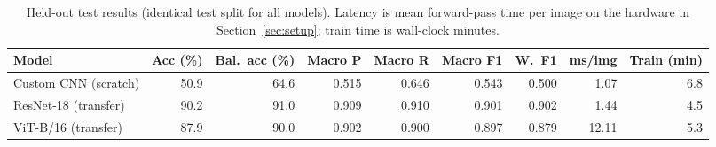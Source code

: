 \begin{table}[H]\centering\small
\caption{Held-out test results (identical test split for all models). Latency is mean forward-pass time per image on the hardware in Section~\ref{sec:setup}; train time is wall-clock minutes.}\label{tab:results}
\begin{tabular}{lrrrrrrrr}\toprule
Model & Acc (\%) & Bal.\ acc (\%) & Macro P & Macro R & Macro F1 & W.\ F1 & ms/img & Train (min) \\\midrule
Custom CNN (scratch) & 50.9 & 64.6 & 0.515 & 0.646 & 0.543 & 0.500 & 1.07 & 6.8 \\
ResNet-18 (transfer) & 90.2 & 91.0 & 0.909 & 0.910 & 0.901 & 0.902 & 1.44 & 4.5 \\
ViT-B/16 (transfer) & 87.9 & 90.0 & 0.902 & 0.900 & 0.897 & 0.879 & 12.11 & 5.3 \\
\bottomrule\end{tabular}\end{table}